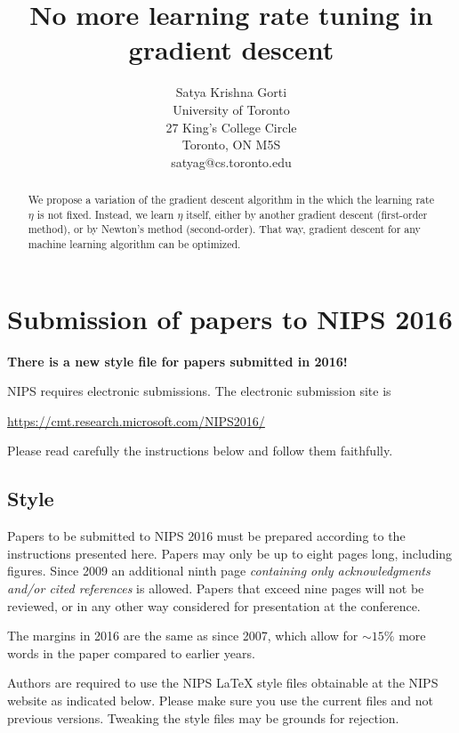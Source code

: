 \documentclass{article}
\title{No more learning rate tuning in gradient descent}
\author{
  	Satya Krishna Gorti\\
  	University of Toronto\\
  	27 King's College Circle\\
  	Toronto, ON M5S\\
  	satyag@cs.toronto.edu
}
\begin{document}
  
  \maketitle
  
  \begin{abstract}
    We propose a variation of the gradient descent algorithm in the which the learning rate $\eta$ is not fixed. Instead, we learn $\eta$ itself, either by another gradient descent (first-order method), or by Newton's method (second-order). That way, gradient descent for any machine learning algorithm can be optimized. 
  \end{abstract}
  
  \section{Submission of papers to NIPS 2016}
  
  \textbf{There is a new style file for papers submitted in 2016!}
  
  NIPS requires electronic submissions.  The electronic submission site
  is
  \begin{center}
    \url{https://cmt.research.microsoft.com/NIPS2016/}
  \end{center}
  
  Please read carefully the instructions below and follow them
  faithfully.
  
  \subsection{Style}
  
  Papers to be submitted to NIPS 2016 must be prepared according to the
  instructions presented here. Papers may only be up to eight pages
  long, including figures. Since 2009 an additional ninth page
  \emph{containing only acknowledgments and/or cited references} is
  allowed. Papers that exceed nine pages will not be reviewed, or in any
  other way considered for presentation at the conference.
  
  The margins in 2016 are the same as since 2007, which allow for
  $\sim$$15\%$ more words in the paper compared to earlier years.
  
  Authors are required to use the NIPS \LaTeX{} style files obtainable
  at the NIPS website as indicated below. Please make sure you use the
  current files and not previous versions. Tweaking the style files may
  be grounds for rejection.
  
\end{document}

